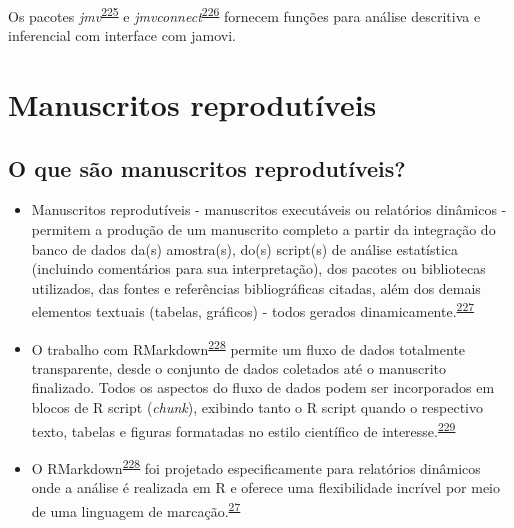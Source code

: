 \documentclass[
  a4paper,
]{book}
\newenvironment{infobox}[1]
  {
  \begin{itemize}
  \renewcommand{\labelitemi}{
    \raisebox{-.7\height}[0pt][0pt]{
      {\setkeys{Gin}{width=3em,keepaspectratio}
        \texttt{[image: \#1]}}
    }
  }
  \setlength{\fboxsep}{1em}
  \begin{blackbox}
  \item
  }
  {
  \end{blackbox}
  \end{itemize}
  }
\begin{document}
\begin{infobox}{images/Rlogo}
Os pacotes \emph{jmv}\textsuperscript{\protect\hyperlink{ref-jmv}{225}} e \emph{jmvconnect}\textsuperscript{\protect\hyperlink{ref-jmvconnect}{226}} fornecem funções para análise descritiva e inferencial com interface com jamovi.

\end{infobox}

\hypertarget{relatuxf3rios-dinamicos}{%
\section{Manuscritos reprodutíveis}\label{relatuxf3rios-dinamicos}}

\hypertarget{o-que-suxe3o-manuscritos-reprodutuxedveis}{%
\subsection{O que são manuscritos reprodutíveis?}\label{o-que-suxe3o-manuscritos-reprodutuxedveis}}

\begin{itemize}
\item
  Manuscritos reprodutíveis - manuscritos executáveis ou relatórios dinâmicos - permitem a produção de um manuscrito completo a partir da integração do banco de dados da(s) amostra(s), do(s) script(s) de análise estatística (incluindo comentários para sua interpretação), dos pacotes ou bibliotecas utilizados, das fontes e referências bibliográficas citadas, além dos demais elementos textuais (tabelas, gráficos) - todos gerados dinamicamente.\textsuperscript{\protect\hyperlink{ref-hinsen2011}{227}}
\item
  O trabalho com RMarkdown\textsuperscript{\protect\hyperlink{ref-R-rmarkdown}{228}} permite um fluxo de dados totalmente transparente, desde o conjunto de dados coletados até o manuscrito finalizado. Todos os aspectos do fluxo de dados podem ser incorporados em blocos de R script (\emph{chunk}), exibindo tanto o R script quando o respectivo texto, tabelas e figuras formatadas no estilo científico de interesse.\textsuperscript{\protect\hyperlink{ref-holmes2021}{229}}
\item
  O RMarkdown\textsuperscript{\protect\hyperlink{ref-R-rmarkdown}{228}} foi projetado especificamente para relatórios dinâmicos onde a análise é realizada em R e oferece uma flexibilidade incrível por meio de uma linguagem de marcação.\textsuperscript{\protect\hyperlink{ref-mair2016}{27}}
\end{itemize}
\end{document}
